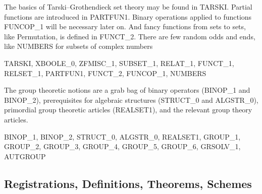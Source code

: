 \nwendcode{}\nwdocspar

\M The basics of Tarski--Grothendieck set theory may be found in
{\Tt{}TARSKI\nwendquote}. Partial functions are introduced in {\Tt{}PARTFUN1\nwendquote}. Binary
operations applied to functions {\Tt{}FUNCOP{\_}1\nwendquote} will be necessary later
on. And fancy functions from sets to sets, like {\Tt{}Permutation\nwendquote}, is
defined in {\Tt{}FUNCT{\_}2\nwendquote}. There are few random odds and ends, like
{\Tt{}NUMBERS\nwendquote} for subsets of complex numbers

\nwenddocs{}\endmoddef\nwstartdeflinemarkup{}\nwenddeflinemarkup
TARSKI, XBOOLE_0, ZFMISC_1, SUBSET_1, RELAT_1, FUNCT_1,
RELSET_1, PARTFUN1, FUNCT_2, FUNCOP_1, NUMBERS

\nwendcode{}\nwdocspar

\M
The group theoretic notions are a grab bag of binary operators
({\Tt{}BINOP{\_}1\nwendquote} and {\Tt{}BINOP{\_}2\nwendquote}), prerequisites for algebraic structures
({\Tt{}STRUCT{\_}0\nwendquote} and {\Tt{}ALGSTR{\_}0\nwendquote}), primordial group theoretic articles
({\Tt{}REALSET1\nwendquote}), and the relevant group theory articles.

\nwenddocs{}\endmoddef\nwstartdeflinemarkup{}\nwenddeflinemarkup
BINOP_1, BINOP_2, STRUCT_0, ALGSTR_0, REALSET1, GROUP_1, GROUP_2,
GROUP_3, GROUP_4, GROUP_5, GROUP_6, GRSOLV_1, AUTGROUP

\nwendcode{}\nwdocspar

\subsection{Registrations, Definitions, Theorems, Schemes}

